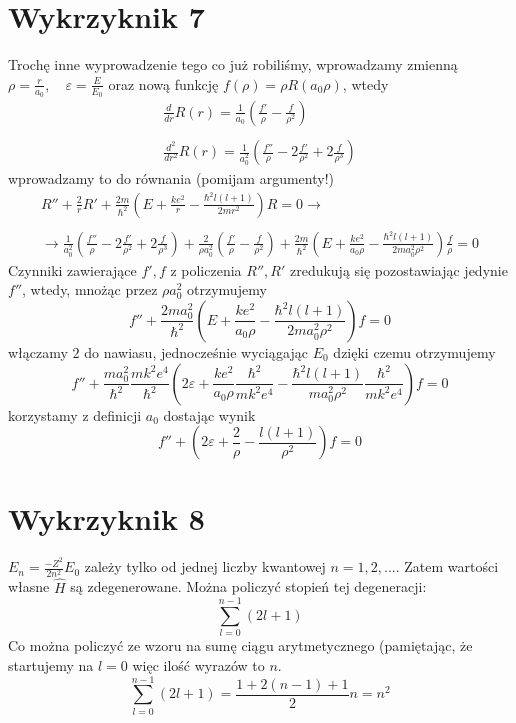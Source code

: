 \documentclass[a4paper,12pt]{article}
\begin{document}
\section{Wykrzyknik 7}
Trochę inne wyprowadzenie tego co już robiliśmy, wprowadzamy zmienną $\rho = \frac{r}{a_0},\quad \varepsilon = \frac{E}{E_0}$ oraz nową funkcję
$f(\rho) = \rho R(a_0 \rho)$, wtedy
$$
\begin{array}{l}
	\frac{d}{dr}R(r) = \frac{1}{a_0}\left(\frac{f'}{\rho} - \frac{f}{\rho^2}\right)\\\\
	\frac{d^2}{dr^2}R(r) = \frac{1}{a_0^2}\left(\frac{f''}{\rho}-2\frac{f'}{\rho^2}+2\frac{f}{\rho^3}\right)
\end{array}
$$
wprowadzamy to do równania (pomijam argumenty!)
$$
\begin{array}{l}
	R'' +\frac{2}{r}R' + \frac{2m}{\hbar^2}\left(E+\frac{ke^2}{r}-\frac{\hbar^2l(l+1)}{2mr^2}\right)R = 0 \to \\\\
	\to \frac{1}{a_0^2}\left(\frac{f''}{\rho}-2\frac{f'}{\rho^2}+2\frac{f}{\rho^3}\right) + \frac{2}{\rho a_0^2}\left(\frac{f'}{\rho} - \frac{f}{\rho^2}\right)
	+\frac{2m}{\hbar^2}\left(E+\frac{ke^2}{a_0\rho}-\frac{\hbar^2l(l+1)}{2ma_0^2\rho^2}\right)\frac{f}{\rho} = 0
\end{array}
$$
Czynniki zawierające $f', f$ z policzenia $R'',R'$ zredukują się pozostawiając jedynie $f''$, wtedy, mnożąc przez $\rho a_0^2$ otrzymujemy
$$
	f''  +\frac{2ma_0^2}{\hbar^2}\left(E+\frac{ke^2}{a_0\rho}-\frac{\hbar^2l(l+1)}{2ma_0^2\rho^2}\right)f = 0
$$
włączamy $2$ do nawiasu, jednocześnie wyciągając $E_0$ dzięki czemu otrzymujemy
$$
	f''  +\frac{ma_0^2}{\hbar^2}\frac{mk^2e^4}{\hbar^2}\left(2\varepsilon+\frac{ke^2}{a_0\rho}\frac{\hbar^2}{mk^2e^4}-\frac{\hbar^2l(l+1)}{ma_0^2\rho^2}\frac{\hbar^2}{mk^2e^4}\right)f = 0
$$
korzystamy z definicji $a_0$ dostając wynik 
$$
	f'' + \left(2\varepsilon+\frac{2}{\rho}- \frac{l(l+1)}{\rho^2}\right)f = 0
$$


\section{Wykrzyknik 8}
$E_n = \frac{-Z^2}{2n^2}E_0$ zależy tylko od jednej liczby kwantowej $n=1, 2,
...$. Zatem wartości własne $\hat{H}$ są zdegenerowane.
Można policzyć stopień tej degeneracji:
\[
  \sum^{n-1}_{l=0} (2l+1) 
\]
Co można policzyć ze wzoru na sumę ciągu arytmetycznego (pamiętając, że
startujemy na $l=0$ więc ilość wyrazów to $n$.
\[
  \sum^{n-1}_{l=0} (2l+1) = \frac{1+2(n-1) + 1}{2}n = n^2
\]
\end{document}
